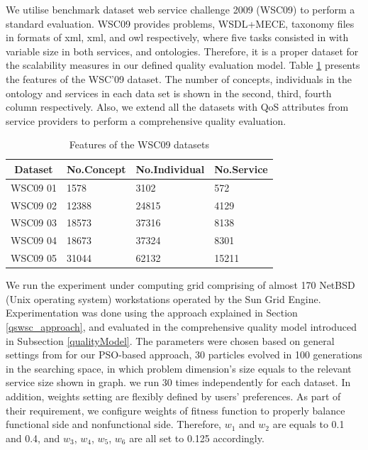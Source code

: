 \documentclass{llncs}
\begin{document}
We utilise benchmark dataset web service challenge 2009 (WSC09) \cite{kona2009wsc} to perform a standard evaluation. WSC09 provides problems,  WSDL+MECE, taxonomy files in formats of xml, xml, and owl respectively, where five tasks consisted in with variable size in both services, and ontologies. Therefore, it is a proper dataset for the scalability measures in our defined quality evaluation model. Table \ref{wsc09datasetTable} presents the features of the WSC’09 dataset. The number of concepts, individuals in the ontology and services in each data set is shown in the second, third, fourth column respectively. Also, we extend all the datasets with QoS attributes from service providers to perform a comprehensive quality evaluation. 
\begin{table}[]
\centering
\caption{Features of the WSC09 datasets}
\label{wsc09datasetTable}
\begin{tabular}{|l|l|l|l|}
\hline
\multicolumn{1}{|c|}{Dataset} & No.Concept & No.Individual & No.Service \\ \hline
WSC09 01                     & 1578       &3102           &572      \\ \hline
WSC09 02                     & 12388      &24815          &4129      \\ \hline
WSC09 03                     & 18573      &37316          &8138      \\ \hline
WSC09 04                     & 18673      &37324          &8301      \\ \hline
WSC09 05                     & 31044      &62132          &15211    \\ \hline
\end{tabular}
\end{table}


We run the experiment under computing grid comprising of almost 170 NetBSD (Unix operating system) workstations operated by the Sun Grid Engine. Experimentation was done using the approach explained in Section \ref{qswsc_approach}, and evaluated in the comprehensive quality model introduced in Subsection \ref{qualityModel}. The parameters were chosen based on general settings from \cite{shi2001particle} for our PSO-based approach, 30 particles evolved in 100 generations in the searching space, in which problem dimension's size equals to the relevant service size shown in graph. we run 30 times independently for each dataset. In addition, weights setting are flexibly defined by users' preferences. As part of their requirement, we configure weights of fitness function to properly balance functional side and nonfunctional side. Therefore, $w_{1}$ and $w_{2}$ are equals to 0.1 and 0.4,  and $w_{3}$, $w_{4}$, $w_{5}$, $w_{6}$ are all set to 0.125 accordingly.
\end{document}
